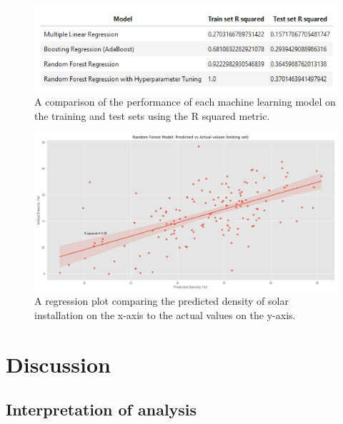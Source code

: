 \documentclass[a4paper]{article}
\begin{document}
\begin{figure}
\centering
  \includegraphics{fig10.png}
  \caption{A comparison of the performance of each machine learning model on the training and test sets using the R squared metric.}
  \label{fig:fig10}
\end{figure}

\begin{figure}
\centering
  \includegraphics[width=\linewidth]{fig11.png}
  \caption{A regression plot comparing the predicted density of solar installation on the x-axis to the actual values on the y-axis.}
  \label{fig:fig11}
\end{figure}

\section{Discussion}

\subsection{Interpretation of analysis}
\end{document}
